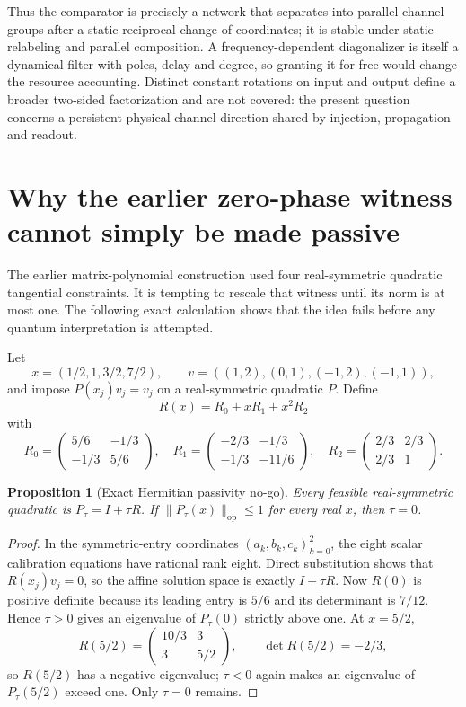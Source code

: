 \documentclass[11pt]{article}
\newtheorem{proposition}[theorem]{Proposition}
\theoremstyle{definition}
\theoremstyle{remark}
\newcommand{\op}{\mathrm{op}}
\begin{document}
Thus the comparator is precisely a network that separates into parallel
channel groups after a static reciprocal change of coordinates; it is stable
under static relabeling and parallel composition.  A frequency-dependent
diagonalizer is itself a dynamical filter with poles, delay and degree, so
granting it for free would change the resource accounting.  Distinct constant
rotations on input and output define a broader two-sided factorization and are
not covered: the present question concerns a persistent physical channel
direction shared by injection, propagation and readout.

\section{Why the earlier zero-phase witness cannot simply be made passive}

The earlier matrix-polynomial construction \cite{ErikssonMIMO2026} used four
real-symmetric quadratic tangential constraints.  It is tempting to rescale
that witness until its norm is at most one.  The following exact calculation
shows that the idea fails before any quantum interpretation is attempted.

Let
\[
 x=(1/2,1,3/2,7/2),\qquad
 v=((1,2),(0,1),(-1,2),(-1,1)),
\]
and impose $P(x_j)v_j=v_j$ on a real-symmetric quadratic $P$.  Define
\[
 R(x)=R_0+xR_1+x^2R_2
\]
with
\[
R_0=\begin{pmatrix}5/6&-1/3\\-1/3&5/6\end{pmatrix},\quad
R_1=\begin{pmatrix}-2/3&-1/3\\-1/3&-11/6\end{pmatrix},\quad
R_2=\begin{pmatrix}2/3&2/3\\2/3&1\end{pmatrix}.
\]

\begin{proposition}[Exact Hermitian passivity no-go]\label{prop:nogo}
Every feasible real-symmetric quadratic is $P_\tau=I+\tau R$.  If
$\|P_\tau(x)\|_{\op}\leq1$ for every real $x$, then $\tau=0$.
\end{proposition}

\begin{proof}
In the symmetric-entry coordinates $(a_k,b_k,c_k)_{k=0}^2$, the eight scalar
calibration equations have rational rank eight.  Direct substitution shows
that $R(x_j)v_j=0$, so the affine solution space is exactly $I+\tau R$.
Now $R(0)$ is positive definite because its leading entry is $5/6$ and its
determinant is $7/12$.  Hence $\tau>0$ gives an eigenvalue of $P_\tau(0)$
strictly above one.  At $x=5/2$,
\[
 R(5/2)=\begin{pmatrix}10/3&3\\3&5/2\end{pmatrix},
 \qquad \det R(5/2)=-2/3,
\]
so $R(5/2)$ has a negative eigenvalue; $\tau<0$ again makes an eigenvalue of
$P_\tau(5/2)$ exceed one.  Only $\tau=0$ remains.
\end{proof}
\end{document}
